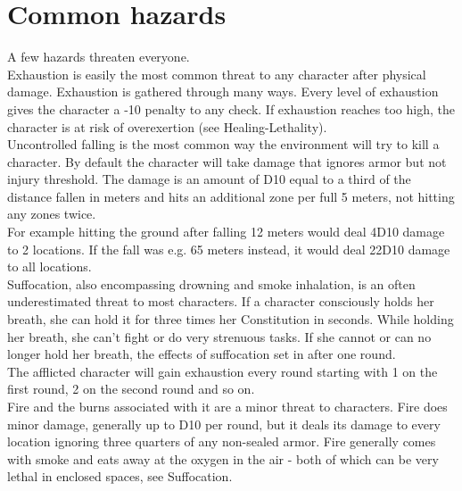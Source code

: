 \documentclass[12pt,a4paper,openany]{book}
\begin{document}
	\section{Common hazards}
	A few hazards threaten everyone.\\
	Exhaustion is easily the most common threat to any character after physical damage. Exhaustion is gathered through many ways. Every level of exhaustion gives the character a -10 penalty to any check. If exhaustion reaches too high, the character is at risk of overexertion (see Healing-Lethality).\\
	Uncontrolled falling is the most common way the environment will try to kill a character. By default the character will take damage that ignores armor but not injury threshold. The damage is an amount of D10 equal to a third of the distance fallen in meters and hits an additional zone per full 5 meters, not hitting any zones twice.\\
	For example hitting the ground after falling 12 meters would deal 4D10 damage to 2 locations. If the fall was e.g. 65 meters instead, it would deal 22D10 damage to all locations.\\
	Suffocation, also encompassing drowning and smoke inhalation, is an often underestimated threat to most characters. If a character consciously holds her breath, she can hold it for three times her Constitution in seconds. While holding her breath, she can’t fight or do very strenuous tasks. If she cannot or can no longer hold her breath, the effects of suffocation set in after one round.\\
	The afflicted character will gain exhaustion every round starting with 1 on the first round, 2 on the second round and so on.\\
	Fire and the burns associated with it are a minor threat to characters. Fire does minor damage, generally up to D10 per round, but it deals its damage to every location ignoring three quarters of any non-sealed armor. Fire generally comes with smoke and eats away at the oxygen in the air - both of which can be very lethal in enclosed spaces, see Suffocation.\\
\end{document}
